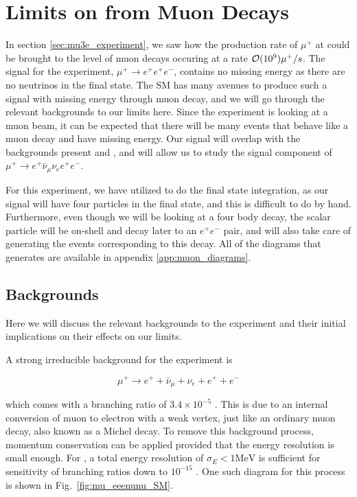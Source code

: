 \section{Limits on \mueee from Muon Decays}
In section \ref{sec:mu3e_experiment}, we saw how the production rate of $\mu^+$ at \mueee could be brought to the level of muon decays occuring at a rate $\operatorname{\mathcal{O}}(10^9) \mu^+/s$.
The signal for the \mueee experiment, $\mu^+ \rightarrow e^+ e^+ e^-$, contains no missing energy as there are no neutrinos in the final state.
The SM has many avenues to produce such a signal with missing energy through muon decay, and we will go through the relevant backgrounds to our limits here.
Since the experiment is looking at a muon beam, it can be expected that there will be many events that behave like a muon decay and have missing energy.
Our signal will overlap with the backgrounds present and \mueee, and will allow us to study the signal component of $\mu^+ \rightarrow e^+ \bar{\nu}_\mu \nu_e e^+ e^-$.

For this experiment, we have utilized \madgraph to do the final state integration, as our signal will have four particles in the final state, and this is difficult to do by hand.
Furthermore, even though we will be looking at a four body decay, the scalar particle will be on-shell and decay later to an $e^+ e^-$ pair, and \madgraph will also take care of generating the events corresponding to this decay.
All of the diagrams that \madgraph generates are available in appendix \ref{app:muon_diagrams}.

\subsection{Backgrounds}
Here we will discuss the relevant backgrounds to the experiment and their initial implications on their effects on our limits.

A strong irreducible background for the experiment is

\begin{equation}
    \mu^+ \rightarrow e^+ + \bar{\nu}_\mu + \nu_e + e^+ + e^-
\end{equation}

\noindent which comes with a branching ratio of $3.4 \times 10^{-5}$ \cite{Agashe:2014kda}. 
This is due to an internal conversion of muon to electron with a weak vertex, just like an ordinary muon decay, also known as a Michel decay.
To remove this background process, momentum conservation can be applied provided that the energy resolution is small enough.
For \mueee, a total energy resolution of $\sigma_E < 1\textrm{MeV}$ is sufficient for sensitivity of branching ratios down to $10^{-15}$ \cite{Blondel:2013ia}.
One such diagram for this process is shown in Fig.\ \ref{fig:mu_eeenunu_SM}.

